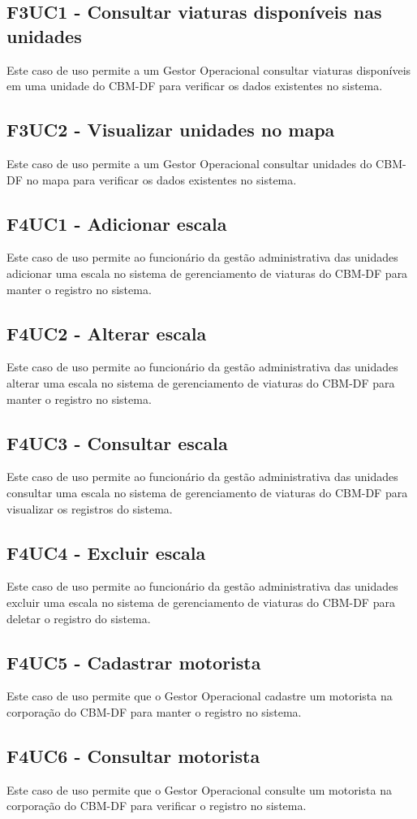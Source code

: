  \subsection{F3UC1 - Consultar viaturas disponíveis nas unidades}
Este caso de uso permite a um Gestor Operacional consultar viaturas disponíveis em uma unidade do CBM-DF para verificar os dados existentes no sistema.
  \subsection{F3UC2 - Visualizar unidades no mapa}
Este caso de uso permite a um Gestor Operacional consultar unidades do CBM-DF no mapa para verificar os dados existentes no sistema.
  \subsection{F4UC1 - Adicionar escala}
Este caso de uso permite ao funcionário da gestão administrativa das unidades adicionar uma escala no sistema de gerenciamento de viaturas do CBM-DF para manter o registro no sistema.
  \subsection{F4UC2 - Alterar escala}
Este caso de uso permite ao funcionário da gestão administrativa das unidades alterar uma escala no sistema de gerenciamento de viaturas do CBM-DF para manter o registro no sistema.
  \subsection{F4UC3 - Consultar escala}
Este caso de uso permite ao funcionário da gestão administrativa das unidades consultar uma escala no sistema de gerenciamento de viaturas do CBM-DF para visualizar os registros do sistema.
  \subsection{F4UC4 - Excluir escala}
Este caso de uso permite ao funcionário da gestão administrativa das unidades  excluir uma escala no sistema de gerenciamento de viaturas do CBM-DF para deletar o registro do sistema.
  \subsection{F4UC5 - Cadastrar motorista}
Este caso de uso permite que o Gestor Operacional cadastre um motorista na corporação do CBM-DF para manter o registro no sistema.
  \subsection{F4UC6 - Consultar motorista}
Este caso de uso permite que o Gestor Operacional consulte um motorista na corporação do CBM-DF para verificar o registro no sistema.
